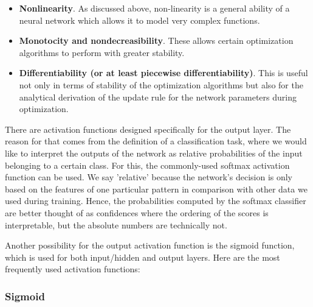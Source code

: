 \begin{itemize}
	
\item \textbf{Nonlinearity}. As discussed above, non-linearity is a general ability of a neural network which allows it to model very complex functions.
\item \textbf{Monotocity and nondecreasibility}. These allows certain optimization algorithms to perform with greater stability.
\item \textbf{Differentiability (or at least piecewise differentiability)}. This is useful not only in terms of stability of the optimization algorithms but also for the analytical derivation of the update rule for the network parameters during optimization. 
		
\end{itemize}

There are activation functions designed specifically for the output layer. The reason for that comes from the definition of a classification task, where we would like to interpret the outputs of the network as relative probabilities of the input belonging to a certain class. For this, the commonly-used softmax activation function can be used. We say 'relative' because the network's decision is only based on the features of one particular pattern in comparison with other data we used during training. Hence, the probabilities computed by the softmax classifier are better thought of as confidences where the ordering of the scores is interpretable, but the absolute numbers are technically not. \cite{stanford-github}

Another possibility for the output activation function is the sigmoid function, which is used for both input/hidden and output layers. Here are the most frequently used activation functions:

\subsubsection{Sigmoid}
\vspace{5mm}

